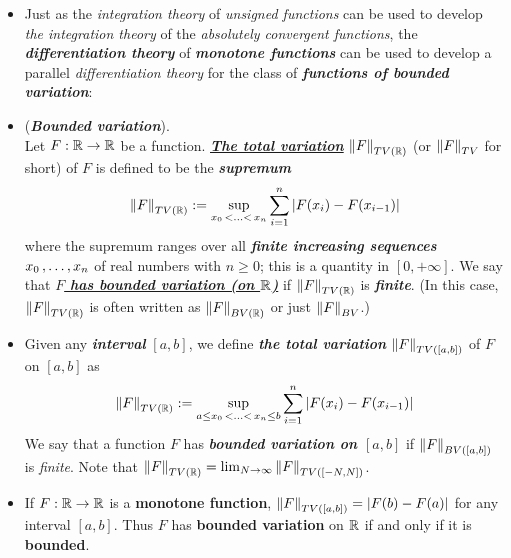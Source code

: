 \documentclass[11pt]{article}
\begin{document}
\begin{itemize}
\item \begin{remark}
Just as the \emph{integration theory} of \emph{unsigned functions} can be used to develop \emph{the integration theory} of the \emph{absolutely convergent functions}, the \emph{\textbf{differentiation theory}} of \emph{\textbf{monotone functions}} can be used to develop a parallel \emph{differentiation theory} for the class of \emph{\textbf{functions of bounded variation}}:
\end{remark}

\item \begin{definition} (\emph{\textbf{Bounded variation}}).\\
Let $F : {\mathbb R} \rightarrow {\mathbb R}$  be a function. \underline{\emph{\textbf{The total variation}}} $\left\|F\right\|_{TV({\mathbb R})}$ (or $\left\|F\right\|_{TV}$ for short) of $F$ is
defined to be the \emph{\textbf{supremum}}
\begin{align*}
\left\|F\right\|_{TV({\mathbb R})} := \sup\limits_{x_0 \,{<}\ldots{<}\, x_n}\sum_{i=1}^{n}\left\lvert F(x_i) - F (x_{i-1}) \right\rvert
\end{align*} where the supremum ranges over all \textbf{\emph{finite increasing sequences}} $x_0 \,{,}\ldots{,}\, x_n$ of real numbers with $n \ge 0$; this is a quantity in $[0, +\infty]$. We say that \underline{\emph{\textbf{$F$ has bounded variation (on ${\mathbb R}$)}}} if $\left\|F\right\|_{TV({\mathbb R})}$ is \emph{\textbf{finite}}. (In this case, $\left\|F\right\|_{TV({\mathbb R})}$ is often written as $\left\|F\right\|_{BV({\mathbb R})}$ or just $\left\|F\right\|_{BV}$.)
\end{definition}

\item \begin{remark}
Given any \emph{\textbf{interval}} $[a, b]$, we define \emph{\textbf{the total variation}} $\left\|F\right\|_{TV([a, b])}$ of $F$ on $[a, b]$ as
\begin{align*}
\left\|F\right\|_{TV({\mathbb R})} := \sup\limits_{a\le x_0 \,{<}\ldots{<}\, x_n \le b}\sum_{i=1}^{n}\left\lvert F(x_i) - F (x_{i-1}) \right\rvert
\end{align*} We say that a function $F$ has \emph{\textbf{bounded variation on $[a, b]$}} if $\left\|F\right\|_{BV([a,b])}$ is \emph{finite}. Note that $\left\|F\right\|_{TV({\mathbb R})} = \lim_{N\rightarrow \infty}\left\|F\right\|_{TV([-N, N])}$.
\end{remark}

\item \begin{proposition}
If $F : {\mathbb R} \rightarrow {\mathbb R}$ is a \textbf{monotone function},  $\left\|F\right\|_{TV([a, b])}= \left\lvert F(b) - F(a) \right\rvert$ for any interval $[a, b]$. Thus $F$ has
\textbf{bounded variation} on ${\mathbb R}$ if and only if it is \textbf{bounded}.
\end{proposition}


\end{itemize}
\end{document}
